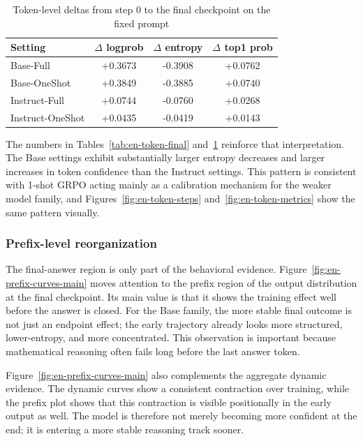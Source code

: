 \documentclass[12pt,a4paper]{ctexart}
\begin{document}
\begin{table}[H]
    \centering
    \caption{Token-level deltas from step 0 to the final checkpoint on the fixed prompt}
    \label{tab:en-token-delta}
    \begin{tabular}{lccc}
        \toprule
        Setting & $\Delta$ logprob & $\Delta$ entropy & $\Delta$ top1 prob \\
        \midrule
        Base-Full & +0.3673 & -0.3908 & +0.0762 \\
        Base-OneShot & +0.3849 & -0.3885 & +0.0740 \\
        Instruct-Full & +0.0744 & -0.0760 & +0.0268 \\
        Instruct-OneShot & +0.0435 & -0.0419 & +0.0143 \\
        \bottomrule
    \end{tabular}
\end{table}

The numbers in Tables~\ref{tab:en-token-final} and~\ref{tab:en-token-delta} reinforce that interpretation. The Base settings exhibit substantially larger entropy decreases and larger increases in token confidence than the Instruct settings. This pattern is consistent with 1-shot GRPO acting mainly as a calibration mechanism for the weaker model family, and Figures~\ref{fig:en-token-steps} and~\ref{fig:en-token-metrics} show the same pattern visually.

\subsubsection{Prefix-level reorganization}

The final-answer region is only part of the behavioral evidence. Figure~\ref{fig:en-prefix-curves-main} moves attention to the prefix region of the output distribution at the final checkpoint. Its main value is that it shows the training effect well before the answer is closed. For the Base family, the more stable final outcome is not just an endpoint effect; the early trajectory already looks more structured, lower-entropy, and more concentrated. This observation is important because mathematical reasoning often fails long before the last answer token.

Figure~\ref{fig:en-prefix-curves-main} also complements the aggregate dynamic evidence. The dynamic curves show a consistent contraction over training, while the prefix plot shows that this contraction is visible positionally in the early output as well. The model is therefore not merely becoming more confident at the end; it is entering a more stable reasoning track sooner.
\end{document}
